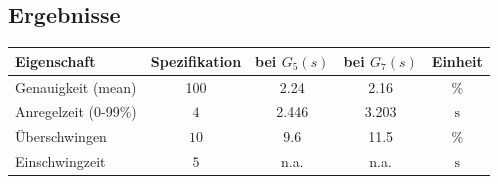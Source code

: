 \subsection{Ergebnisse}
\begin{table}[h!]
	\centering
	\begin{tabular}{l c c c c}
		Eigenschaft
			& Spezifikation
			& bei $G_5(s)$
			& bei $G_7(s)$
			& Einheit \\
		\hline
		Genauigkeit (mean)
			& 100
			& 2.24
			& 2.16
			& \% \\
		Anregelzeit (0-99\%)
			& $4$
			& 2.446 
			& 3.203
			& $\si{\second}$ \\
		Überschwingen
			& $10$
			& 9.6 
			& 11.5
			& \% \\
		Einschwingzeit
			& $5$
			& n.a. 
			& n.a.
			& $\si{\second}$ \\
	\end{tabular}
\end{table}
